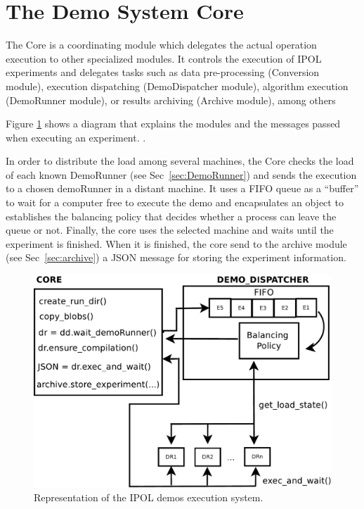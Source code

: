 \section{The Demo System Core}
The Core is a coordinating module which delegates the actual operation execution to other specialized modules. It controls the execution of IPOL experiments and delegates tasks such as data pre-processing (Conversion module), execution dispatching (DemoDispatcher module), algorithm execution (DemoRunner module), or results archiving (Archive module), among others

Figure \ref{fig:core_diagram} shows a diagram that explains the modules and the messages passed when executing an experiment. .

In order to distribute the load among several machines, the Core checks the load of each known DemoRunner (see Sec~\ref{sec:DemoRunner}) and sends the execution to a chosen demoRunner in a distant machine. It uses a FIFO queue as a ``buffer'' to wait for a computer free to execute the demo and encapsulates an object to establishes the balancing policy that decides whether a process can leave the queue or not. Finally, the core uses the selected machine and waits until the experiment is finished. When it is finished, the core send to the archive module (see Sec~\ref{sec:archive}) a JSON message for storing the experiment information.

\begin{figure}[!ht]
\centering
\includegraphics[width=0.7\columnwidth]{core/images/core_diagram.pdf}
\caption{Representation of the IPOL demos execution system.} 
\label{fig:core_diagram}
\end{figure}


